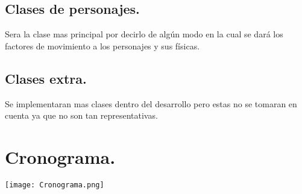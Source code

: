 \documentclass{article}
\begin{document}
\subsection{Clases de personajes.}
Sera la clase mas principal por decirlo de algún modo en la cual se dará los factores de movimiento a los personajes y sus físicas.
\subsection{Clases extra.}
Se implementaran mas clases dentro del desarrollo pero estas no se tomaran en cuenta ya que no son tan representativas.
\vspace{5.2cm}
\section{Cronograma.}

\texttt{[image: Cronograma.png]}
\end{document}
